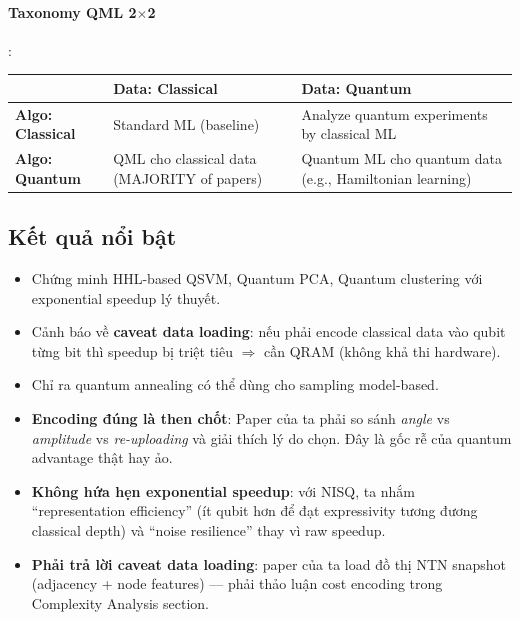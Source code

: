 \documentclass[11pt,a4paper]{article}
\begin{document}
\paragraph{Taxonomy QML 2$\times$2}:

\begin{longtable}{@{}p{2.5cm} p{5.5cm} p{6cm}@{}}
\toprule
 & \textbf{Data: Classical} & \textbf{Data: Quantum} \\
\midrule
\endhead
\textbf{Algo: Classical} & Standard ML (baseline) & Analyze quantum experiments by classical ML \\
\textbf{Algo: Quantum} & QML cho classical data (MAJORITY of papers) & Quantum ML cho quantum data (e.g., Hamiltonian learning) \\
\bottomrule
\end{longtable}

\subsection{Kết quả nổi bật}
\begin{itemize}
  \item Chứng minh HHL-based QSVM, Quantum PCA, Quantum clustering với exponential speedup lý thuyết.
  \item Cảnh báo về \textbf{caveat data loading}: nếu phải encode classical data vào qubit từng bit thì speedup bị triệt tiêu $\Rightarrow$ cần QRAM (không khả thi hardware).
  \item Chỉ ra quantum annealing có thể dùng cho sampling model-based.
\end{itemize}

\begin{take}
\begin{itemize}
  \item \textbf{Encoding đúng là then chốt}: Paper của ta phải so sánh \textit{angle} vs \textit{amplitude} vs \textit{re-uploading} và giải thích lý do chọn. Đây là gốc rễ của quantum advantage thật hay ảo.
  \item \textbf{Không hứa hẹn exponential speedup}: với NISQ, ta nhắm ``representation efficiency'' (ít qubit hơn để đạt expressivity tương đương classical depth) và ``noise resilience'' thay vì raw speedup.
  \item \textbf{Phải trả lời caveat data loading}: paper của ta load đồ thị NTN snapshot (adjacency + node features) --- phải thảo luận cost encoding trong Complexity Analysis section.
\end{itemize}
\end{take}
\end{document}
